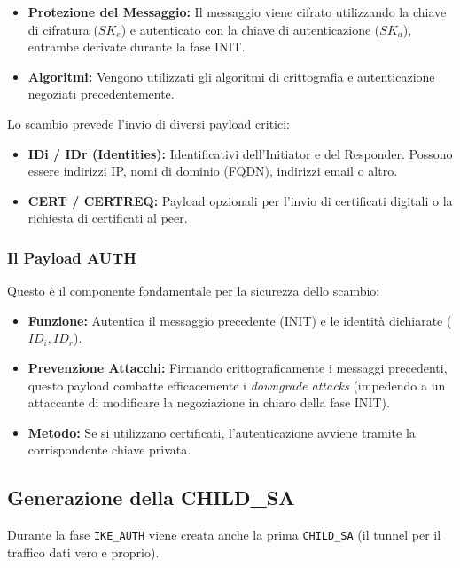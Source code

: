 \documentclass[a4paper, 11pt]{article}
\begin{document}
\begin{itemize}
    \item \textbf{Protezione del Messaggio:} Il messaggio viene cifrato utilizzando la chiave di cifratura ($SK_e$) e autenticato con la chiave di autenticazione ($SK_a$), entrambe derivate durante la fase INIT.
    \item \textbf{Algoritmi:} Vengono utilizzati gli algoritmi di crittografia e autenticazione negoziati precedentemente.
\end{itemize}

Lo scambio prevede l'invio di diversi payload critici:

\begin{itemize}
    \item \textbf{IDi / IDr (Identities):} Identificativi dell'Initiator e del Responder. Possono essere indirizzi IP, nomi di dominio (FQDN), indirizzi email o altro.
    \item \textbf{CERT / CERTREQ:} Payload opzionali per l'invio di certificati digitali o la richiesta di certificati al peer.
\end{itemize}

\subsubsection{Il Payload AUTH}
Questo è il componente fondamentale per la sicurezza dello scambio:
\begin{itemize}
    \item \textbf{Funzione:} Autentica il messaggio precedente (INIT) e le identità dichiarate ($ID_i, ID_r$).
    \item \textbf{Prevenzione Attacchi:} Firmando crittograficamente i messaggi precedenti, questo payload combatte efficacemente i \textit{downgrade attacks} (impedendo a un attaccante di modificare la negoziazione in chiaro della fase INIT).
    \item \textbf{Metodo:} Se si utilizzano certificati, l'autenticazione avviene tramite la corrispondente chiave privata.
\end{itemize}

\subsection{Generazione della CHILD\_SA}
Durante la fase \texttt{IKE\_AUTH} viene creata anche la prima \texttt{CHILD\_SA} (il tunnel per il traffico dati vero e proprio).
\end{document}
